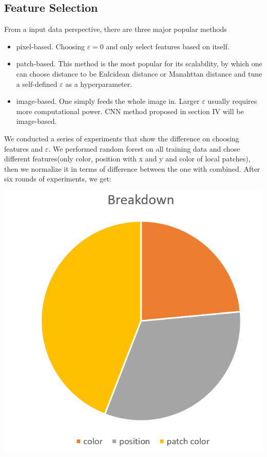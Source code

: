 \documentclass[conference]{IEEEtran}
\begin{document}
\subsection{Feature Selection}
From a input data perspective, there are three major popular methods
\begin{itemize}
\item pixel-based. Choosing $\varepsilon = 0$ and only select features based on itself.
\item patch-based. This method is the most popular for its scalability, by which one can choose distance to be Eulcidean distance or Manahttan distance and tune a self-defined $\varepsilon$ as a hyperparameter. 
\item image-based. One simply feeds the whole image in. Larger $\varepsilon$ usually requires more computational power. CNN method proposed in section IV will be image-based.
\end{itemize}
We conducted a series of experiments that show the difference on choosing features and $\varepsilon$. We performed random forest on all training data and chose different features(only color, position with x and y and color of local patches), then we normalize it in terms of difference between the one with combined. After six rounds of experiments, we get:

\includegraphics[scale = 0.6]{Snipaste_2018-05-28_13-52-29.png}
\end{document}
